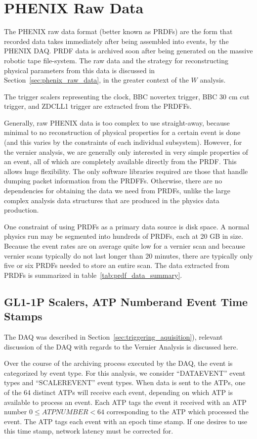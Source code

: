 \clearpage
\section{PHENIX Raw Data} 

The PHENIX raw data format (better known as PRDFs) are the form that recorded
data takes immediately after being assembled into events, by the PHENIX DAQ.
PRDF data is archived soon after being generated on the massive robotic tape
file-system. The raw data and the strategy for reconstructing physical
parameters from this data is discussed in Section~\ref{sec:phenix_raw_data}, in
the greater context of the $W$ analysis.

The trigger scalers representing the clock, BBC novertex trigger, BBC 30 cm
cut trigger, and ZDCLL1 trigger are extracted from the PRDFFs.

Generally, raw PHENIX data is too complex to use straight-away, because minimal
to no reconstruction of physical properties for a certain event is done (and
this varies by the constraints of each individual subsystem).  However, for the
vernier analysis, we are generally only interested in very simple properties of
an event, all of which are completely available directly from the PRDF. This
allows huge flexibility. The only software libraries required are those that
handle dumping packet information from the PRDFFs. Otherwise, there are no
dependencies for obtaining the data we need from PRDFs, unlike the large complex
analysis data structures that are produced in the physics data production.

One constraint of using PRDFs as a primary data source is disk space. A normal
physics run may be segmented into hundreds of PRDFs, each at 20 GB in size.
Because the event rates are on average quite low for a vernier scan and because
vernier scans typically do not last longer than 20 minutes, there are typically
only five or six PRDFs needed to store an entire scan. The data extracted from
PRDFs is summarized in table~\ref{tab:prdf_data_summary}.

\subsection{GL1-1P Scalers, ATP Numberand Event Time Stamps}

The DAQ was described in Section~\ref{sec:triggering_aquisition}), relevant
discussion of the DAQ with regards to the Vernier Analysis is discussed here.

Over the course of the archiving process executed by the DAQ, the event is
categorized by event type.  For this analysis, we consider ``DATAEVENT'' event
types and ``SCALEREVENT'' event types. When data is sent to the ATPs, one of the
64 distinct ATPs will receive each event, depending on which ATP is available to
process an event. Each ATP tags the event it received with an ATP number $0 \leq
ATPNUMBER < 64$ corresponding to the ATP which processed the event. The ATP tags
each event with an epoch time stamp. If one desires to use this time stamp,
network latency must be corrected for.

